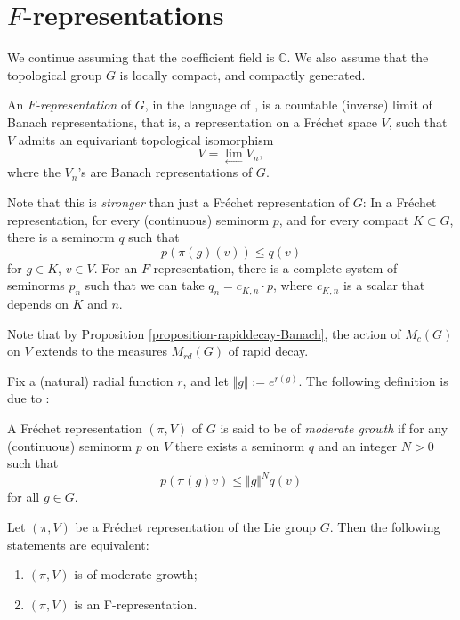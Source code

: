\section{$F$-representations}
\label{section-Frepresentations}

We continue assuming that the coefficient field is $\mathbb C$. We also assume that the topological group $G$ is locally compact, and compactly generated. 

\begin{definition}
\label{definition-Frepresentation}
An {\it $F$-representation} of $G$, in the language of 
\cite{Bernstein-Kroetz}, 
is a countable (inverse) limit of Banach representations, that is, a representation on a Fr\'echet space $V$, such that $V$ admits an equivariant topological isomorphism 
$$ 
V = \lim_{\leftarrow} V_n,
$$
where the $V_n$'s are Banach representations of $G$.
\end{definition}
 
Note that this is {\it stronger} than just a Fr\'echet representation of $G$: In a Fr\'echet representation, for every (continuous) seminorm $p$, and for every compact $K\subset G$, there is a seminorm $q$ such that 
$$ p(\pi(g) (v)) \le q(v)$$
for $g\in K$, $v\in V$. For an $F$-representation, there is a complete system of seminorms $p_n$ such that we can take $q_n=c_{K,n}\cdot p$, where $c_{K,n}$ is a scalar that depends on $K$ and $n$.

Note that by Proposition \ref{proposition-rapiddecay-Banach}, the action of $M_c(G)$ on $V$ extends to the measures $M_{rd}(G)$ of rapid decay. 

Fix a (natural) radial function $r$, and let $\Vert g\Vert:= e^{r(g)}$. The following definition is due to \cite{Casselman-canonicalextensions}:

\begin{definition}
\label{definition-moderate-growth}
A Fr\'echet representation $(\pi,V)$ of $G$ is said to be of {\it moderate
growth} if for any (continuous) seminorm $p$ on $V$ there exists a seminorm $q$
and an integer $N > 0$ such that
$$
p(\pi(g)v) \le \Vert g\Vert^N q(v)
$$
for all $g \in G$.
\end{definition}

\begin{lemma}
\label{lemma-F-moderate-growth} 
 Let $(\pi, V)$ be a Fr\'echet representation of the Lie group
$G$. Then the following statements are equivalent:
\begin{enumerate}
 \item  $(\pi,V)$ is of moderate growth;
 \item $(\pi, V)$ is an F-representation.
\end{enumerate}
\end{lemma}

